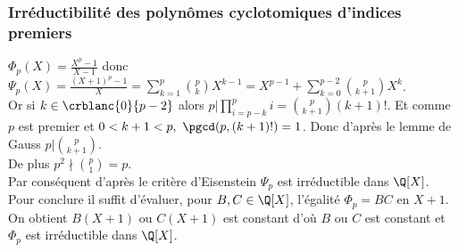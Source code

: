 \documentclass{book}
\begin{document}
	\subsubsection{Irréductibilité des polynômes cyclotomiques d'indices premiers }
	$\Phi_p(X)=\displaystyle\frac{X^p-1}{X-1}$ donc $\Psi_p(X)=\displaystyle\frac{(X+1)^p-1}{X}=\sum_{k=1}^p\binom{p}{k}X^{k-1}=X^{p-1}+\sum_{k=0}^{p-2}\binom{p}{k+1}X^k$.\\
	Or si $k\in \crblanc{0}{p-2}$ alors $p|\displaystyle\prod_{i=p-k}^pi=\binom{p}{k+1}(k+1)!$. Et comme $p$ est premier et $0<k+1<p,\ \pgcd(p,(k+1)!)=1$. Donc d'après le lemme de Gauss $p|\displaystyle\binom{p}{k+1}$.\\
	De plus $p^2\nmid\displaystyle\binom{p}{1}=p$.\\
	Par conséquent d'après le critère d'Eisenstein $\Psi_p$ est irréductible dans $\Q[X]$.\\
	Pour conclure il suffit d'évaluer, pour $B,C\in \Q[X]$, l'égalité $\Phi_p=BC$ en $X+1$. On obtient $B(X+1)$ ou $C(X+1)$ est constant d'où $B$ ou $C$ est constant et $\Phi_p$ est irréductible dans $\Q[X]$.
	
\end{document}
